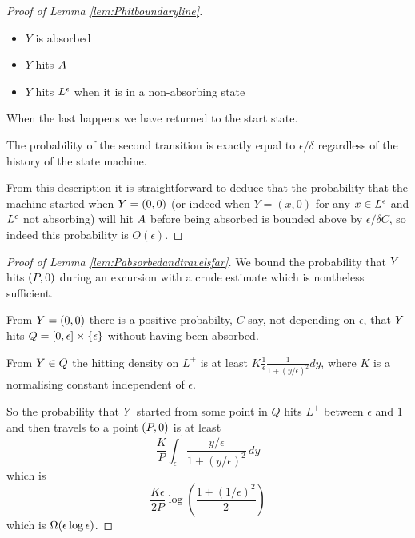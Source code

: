 {\begin{proof}[Proof of Lemma \ref{lem:Phitboundaryline}]
\begin{itemize}
\item $Y$ is absorbed
\item $Y$ hits $A$
\item $Y$ hits $L^\epsilon$ when it is in a non-absorbing state
\end{itemize}

When the last happens we have returned to the start state.

The probability of the second transition is exactly equal to
$\epsilon/\delta$ regardless of the history of the state machine.

From this description it is straightforward to deduce that the
probability that the machine started when $Y = (0,0)$ (or indeed when
$Y = (x, 0)$ for any $x \in L^\epsilon$ and $L^\epsilon$ not absorbing) will hit
$A$ before being absorbed is
bounded above by $\epsilon/\delta C$, so indeed this probability is
$O(\epsilon)$.
\end{proof}

\begin{proof}[Proof of Lemma \ref{lem:Pabsorbedandtravelsfar}]
We bound the probability that $Y$ hits $(P,0)$ during an
excursion with a crude estimate which is nontheless sufficient.

From $Y = (0,0)$ there is a positive probabilty, $C$ say, not
depending on $\epsilon$, that $Y$ hits $Q = [0, \epsilon] \times
\{\epsilon\}$ without having been absorbed.

From $Y \in Q$ the hitting density on $L^+$ is at least $K
\frac{1}{\epsilon} \frac{1}{1 + (y/\epsilon)^2} dy$, where $K$ is a
normalising constant independent of $\epsilon$.

So the probability that $Y$ started from some point in $Q$ hits $L^+$
between $\epsilon$ and $1$ and then travels to a point $(P,0)$ is at least
\[
\frac{K}{P} \int_{\epsilon}^{1} \frac{y/\epsilon}{1 + (y/\epsilon)^2}
\, dy
\]
which is
\[
\frac{K\epsilon}{2P} \log\left(\frac{1 + (1/\epsilon)^2}{2}\right)
\]
which is $\Omega(\epsilon\log\epsilon)$.
\end{proof}
}
